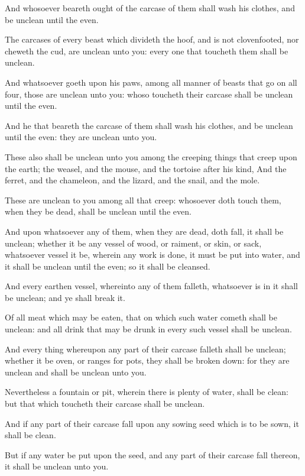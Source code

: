 \verse And whosoever beareth ought of the carcase of them shall wash his clothes, and be unclean until the even.

\verse The carcases of every beast which divideth the hoof, and is not clovenfooted, nor cheweth the cud, are unclean unto you: every one that toucheth them shall be unclean.

\verse And whatsoever goeth upon his paws, among all manner of beasts that go on all four, those are unclean unto you: whoso toucheth their carcase shall be unclean until the even.

\verse And he that beareth the carcase of them shall wash his clothes, and be unclean until the even: they are unclean unto you.

\verse These also shall be unclean unto you among the creeping things that creep upon the earth; the weasel, and the mouse, and the tortoise after his kind, \verse And the ferret, and the chameleon, and the lizard, and the snail, and the mole.

\verse These are unclean to you among all that creep: whosoever doth touch them, when they be dead, shall be unclean until the even.

\verse And upon whatsoever any of them, when they are dead, doth fall, it shall be unclean; whether it be any vessel of wood, or raiment, or skin, or sack, whatsoever vessel it be, wherein any work is done, it must be put into water, and it shall be unclean until the even; so it shall be cleansed.

\verse And every earthen vessel, whereinto any of them falleth, whatsoever is in it shall be unclean; and ye shall break it.

\verse Of all meat which may be eaten, that on which such water cometh shall be unclean: and all drink that may be drunk in every such vessel shall be unclean.

\verse And every thing whereupon any part of their carcase falleth shall be unclean; whether it be oven, or ranges for pots, they shall be broken down: for they are unclean and shall be unclean unto you.

\verse Nevertheless a fountain or pit, wherein there is plenty of water, shall be clean: but that which toucheth their carcase shall be unclean.

\verse And if any part of their carcase fall upon any sowing seed which is to be sown, it shall be clean.

\verse But if any water be put upon the seed, and any part of their carcase fall thereon, it shall be unclean unto you.

